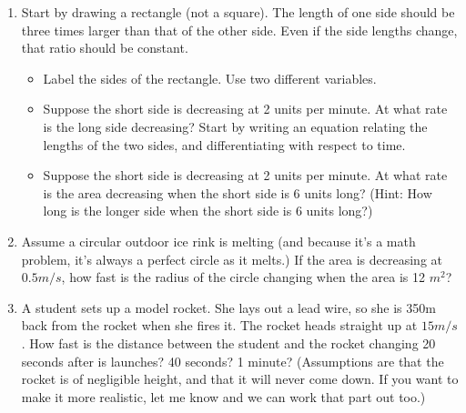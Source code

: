 \documentclass{article}
\begin{document}
\begin{enumerate}
\item Start by drawing a rectangle (not a square). The length of one side should be three times larger than that of the other side. Even if the side lengths change, that ratio should be constant.
\begin{itemize}
\item Label the sides of the rectangle. Use two different variables.
\item Suppose the short side is decreasing at 2 units per minute. At what rate is the long side decreasing? Start by writing an equation relating the lengths of the two sides, and differentiating with respect to time.
\item Suppose the short side is decreasing at 2 units per minute. At what rate is the area decreasing when the short side is 6 units long? (Hint: How long is the longer side when the short side is 6 units long?)
\end{itemize}
\item Assume a circular outdoor ice rink is melting (and because it's a math problem, it's always a perfect circle as it melts.) If the area is decreasing at $0.5 m/s$, how fast is the radius of the circle changing when the area is 12 $m^2$? 
\item A student sets up a model rocket. She lays out a lead wire, so she is 350m back from the rocket when she fires it. The rocket heads straight up at $15m/s$. How fast is the distance between the student and the rocket changing 20 seconds after is launches? 40 seconds? 1 minute? (Assumptions are that the rocket is of negligible height, and that it will never come down. If you want to make it more realistic, let me know and we can work that part out too.) 
\end{enumerate}
\end{document}
